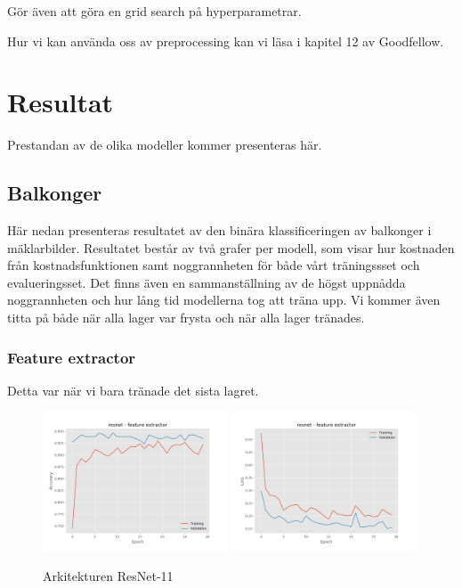 \documentclass{kththesis}
\begin{document}
Gör även att göra en grid search på hyperparametrar.

Hur vi kan använda oss av preprocessing kan vi  läsa i kapitel 12 av Goodfellow.

\chapter{Resultat}
Prestandan av de olika modeller kommer presenteras här.

  \section{Balkonger}
  Här nedan presenteras resultatet av den binära klassificeringen av balkonger i mäklarbilder.
  Resultatet består av två grafer per modell, som visar hur kostnaden från kostnadsfunktionen samt noggrannheten för både vårt träningssset och evalueringsset.
  Det finns även en sammanställning av de högst uppnådda noggrannheten och hur lång tid modellerna tog att träna upp.
  Vi kommer även titta på både när alla lager var frysta och när alla lager tränades.

    \subsection{Feature extractor}
    Detta var när vi bara tränade det sista lagret.

    \begin{figure}
      \centering
      \includegraphics[width=0.49\textwidth]{"./balcony/balcony-20split - acc - resnet - feature extractor"}
      \includegraphics[width=0.49\textwidth]{"./balcony/balcony-20split - loss - resnet - feature extractor"}
      \caption{Arkitekturen ResNet-11}
    \end{figure}
\end{document}
